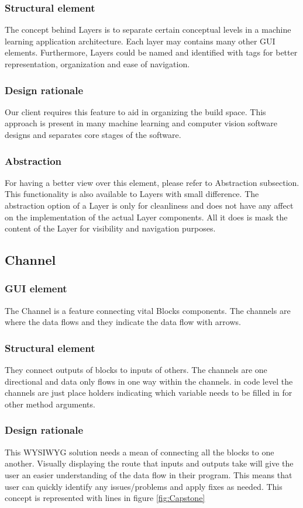 \documentclass[journal,10pt,onecolumn,compsoc]{IEEEtran} \usepackage[margin=1.0in]{geometry} \usepackage{pdfpages}
\begin{document}
\subsubsection{Structural element}
\noindent The concept behind Layers is to separate certain conceptual levels in a machine learning application architecture. 
Each layer may contains many other GUI elements. 
Furthermore, Layers could be named and identified with tags for better representation, organization and ease of navigation.
\subsubsection{Design rationale}
\noindent Our client requires this feature to aid in organizing the build space.
This approach is present in many machine learning and computer vision software designs and separates core stages of the software.
\subsubsection{Abstraction}
\noindent For having a better view over this element, please refer to Abstraction subsection. 
This functionality is also available to Layers with small difference. 
The abstraction option of a Layer is only for cleanliness and does not have any affect on the implementation of the actual Layer components. 
All it does is mask the content of the Layer for visibility and navigation purposes.
\subsection{Channel}
\subsubsection{GUI element}
\noindent The Channel is a feature connecting vital Blocks components. The channels are where the data flows and they indicate the data flow with arrows.
\subsubsection{Structural element}
\noindent They connect outputs of blocks to inputs of others. The channels are one directional and data only flows in one way within the channels. in code level the channels are just place holders indicating which variable needs to be filled in for other method arguments.
\subsubsection{Design rationale}
\noindent This WYSIWYG solution needs a mean of connecting all the blocks to one another. Visually displaying the route that inputs and outputs take will give the user an easier understanding of the data flow in their program. This means that user can quickly identify any issues/problems and apply fixes as needed. This concept is represented with lines in figure \ref{fig:Capstone}
\end{document}
